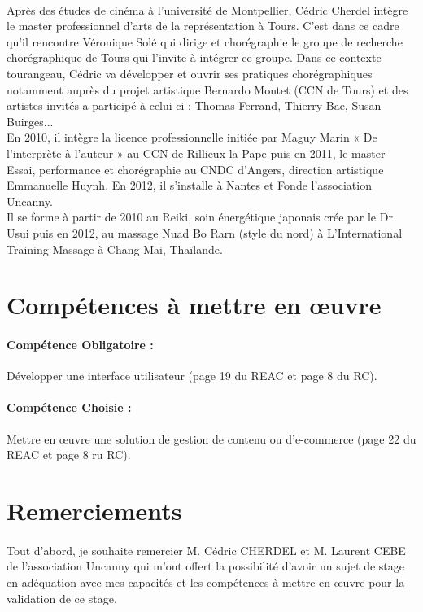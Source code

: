 \documentclass[11pt,a4paper,twoside]{report}
\begin{document}
		\paragraph*{}Après des études de cinéma à l'université de Montpellier, Cédric Cherdel intègre le master professionnel d'arts de la représentation à Tours. C'est dans ce cadre qu'il rencontre Véronique Solé qui dirige et chorégraphie le groupe de recherche chorégraphique de Tours qui l'invite à intégrer ce groupe. Dans ce contexte tourangeau, Cédric va développer et ouvrir ses pratiques chorégraphiques notamment auprès du projet artistique Bernardo Montet (CCN de Tours) et des artistes invités a participé à celui-ci : Thomas Ferrand, Thierry Bae, Susan Buirges...\\
		En 2010, il intègre la licence professionnelle initiée par Maguy Marin « De l'interprète à l'auteur » au CCN de Rillieux la Pape puis en 2011, le master Essai, performance et chorégraphie au CNDC d'Angers, direction artistique Emmanuelle Huynh. En 2012, il s'installe à Nantes et Fonde l'association Uncanny.\\
		Il se forme à partir de 2010 au Reiki, soin énergétique japonais crée par le Dr Usui puis en 2012, au massage Nuad Bo Rarn (style du nord) à L'International Training Massage à Chang Mai, Thaïlande.
	\section{Compétences à mettre en œuvre}
		\paragraph*{\indent Compétence Obligatoire :} Développer une interface utilisateur (page 19 du REAC et page 8 du RC).
		\paragraph*{\indent Compétence Choisie :} Mettre en œuvre une solution de gestion de contenu ou d’e-commerce (page 22 du REAC et page 8 ru RC).
		\newpage
	\section{Remerciements}
		\paragraph*{}Tout d'abord, je souhaite  remercier M. Cédric CHERDEL et M. Laurent CEBE de l'association Uncanny qui m'ont offert la possibilité d'avoir un sujet de stage en adéquation avec mes capacités et les compétences à mettre en œuvre pour la validation de ce stage.
\end{document}
